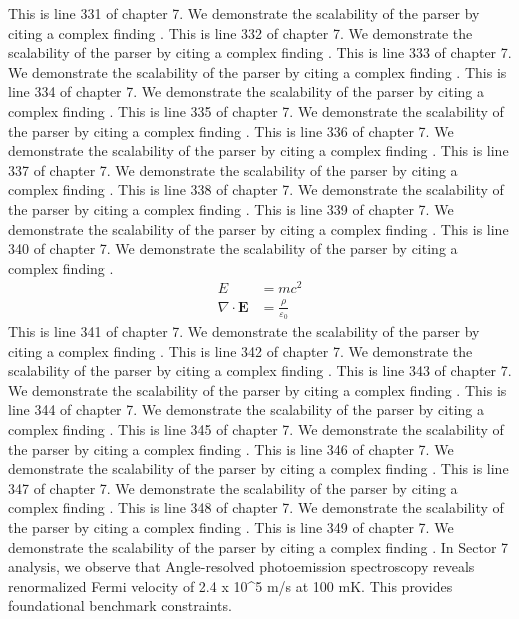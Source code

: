 This is line 331 of chapter 7. We demonstrate the scalability of the parser by citing a complex finding \cite{ref7_331}.
This is line 332 of chapter 7. We demonstrate the scalability of the parser by citing a complex finding \cite{ref7_332}.
This is line 333 of chapter 7. We demonstrate the scalability of the parser by citing a complex finding \cite{ref7_333}.
This is line 334 of chapter 7. We demonstrate the scalability of the parser by citing a complex finding \cite{ref7_334}.
This is line 335 of chapter 7. We demonstrate the scalability of the parser by citing a complex finding \cite{ref7_335}.
This is line 336 of chapter 7. We demonstrate the scalability of the parser by citing a complex finding \cite{ref7_336}.
This is line 337 of chapter 7. We demonstrate the scalability of the parser by citing a complex finding \cite{ref7_337}.
This is line 338 of chapter 7. We demonstrate the scalability of the parser by citing a complex finding \cite{ref7_338}.
This is line 339 of chapter 7. We demonstrate the scalability of the parser by citing a complex finding \cite{ref7_339}.
This is line 340 of chapter 7. We demonstrate the scalability of the parser by citing a complex finding \cite{ref7_340}.
\begin{align*}
  E &= mc^2 \\
  \nabla \cdot \mathbf{E} &= \frac{\rho}{\varepsilon_0}
\end{align*}
This is line 341 of chapter 7. We demonstrate the scalability of the parser by citing a complex finding \cite{ref7_341}.
This is line 342 of chapter 7. We demonstrate the scalability of the parser by citing a complex finding \cite{ref7_342}.
This is line 343 of chapter 7. We demonstrate the scalability of the parser by citing a complex finding \cite{ref7_343}.
This is line 344 of chapter 7. We demonstrate the scalability of the parser by citing a complex finding \cite{ref7_344}.
This is line 345 of chapter 7. We demonstrate the scalability of the parser by citing a complex finding \cite{ref7_345}.
This is line 346 of chapter 7. We demonstrate the scalability of the parser by citing a complex finding \cite{ref7_346}.
This is line 347 of chapter 7. We demonstrate the scalability of the parser by citing a complex finding \cite{ref7_347}.
This is line 348 of chapter 7. We demonstrate the scalability of the parser by citing a complex finding \cite{ref7_348}.
This is line 349 of chapter 7. We demonstrate the scalability of the parser by citing a complex finding \cite{ref7_349}.
In Sector 7 analysis, we observe that Angle-resolved photoemission spectroscopy reveals renormalized Fermi velocity of 2.4 x 10^5 m/s at 100 mK. This provides foundational benchmark constraints.
